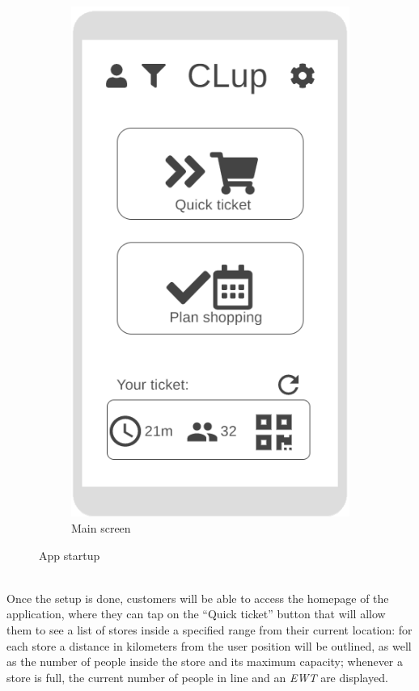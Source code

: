 \begin{figure}[h!]
\begin{subfigure}[b]{0.3\textwidth}
		\includegraphics[width=\linewidth]{../Diagrams/WireframesCLup/MainScreen.png}
		\caption{Main screen}
		\label{fig:WfMain}
	\end{subfigure}
	\caption{App startup}
	\label{fig:WireframesStartup}
\end{figure}
\\Once the setup is done, customers will be able to access the homepage of the application, where they can tap on the “Quick ticket” button that will allow them to see a list of stores inside a specified range from their current location: for each store a distance in kilometers from the user position will be outlined, as well as the number of people inside the store and its maximum capacity; whenever a store is full, the current number of people in line and an \textit{EWT} are displayed.\newline  
